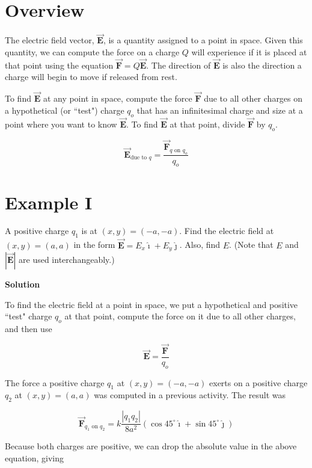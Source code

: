 \documentclass{article}
\newcommand{\ihat}[0]{\hat{\boldsymbol{\imath}}}
\newcommand{\jhat}[0]{\hat{\boldsymbol{\jmath}}}
\newcommand{\bfvec}[1]{\vec{\mathbf{#1}}}
\begin{document}

\section{Overview}

The electric field vector, $\bfvec{E}$, is a quantity assigned to a point in space. Given this quantity, we can compute the force on a charge $Q$ will experience if it is placed at that point using the equation $\bfvec{F}=Q\bfvec{E}$. The direction of $\bfvec{E}$ is also the direction a charge will begin to move if released from rest.

To find $\bfvec{E}$ at any point in space, 
compute the force $\bfvec{F}$ due to all other charges on a hypothetical (or ``test") charge $q_o$ that has an infinitesimal charge and size at a point where you want to know $\bfvec{E}$. To find $\bfvec{E}$ at that point, divide $\bfvec{F}$ by $q_o$.

$$\bfvec{E}_{\text{due to }q} = \frac{\bfvec{F}_{q\text{ on }q_o}}{q_o}$$


\section{Example I}

A positive charge $q_1$ is at $(x,y)=(-a,-a)$. Find the electric field at $(x,y)=(a,a)$ in the form $\bfvec{E}=E_x\ihat + E_y\jhat$. Also, find $E$. (Note that $E$ and $|\bfvec{E}|$ are used interchangeably.)

\textbf{Solution}

To find the electric field at a point in space, we put a hypothetical and positive ``test" charge $q_o$ at that point, compute the force on it due to all other charges, and then use

$$\bfvec{E} = \frac{\bfvec{F}}{q_o}$$

The force a positive charge $q_1$ at $(x,y)=(-a,-a)$ exerts on a positive charge $q_2$ at $(x,y)=(a, a)$ was computed in a previous activity. The result was

$$\bfvec{F}_{q_1\text{ on } q_2}=k\frac{|q_1q_2|}{8a^2}(\cos 45^\circ \ihat + \sin 45^\circ \jhat)$$

Because both charges are positive, we can drop the absolute value in the above equation, giving
\end{document}
